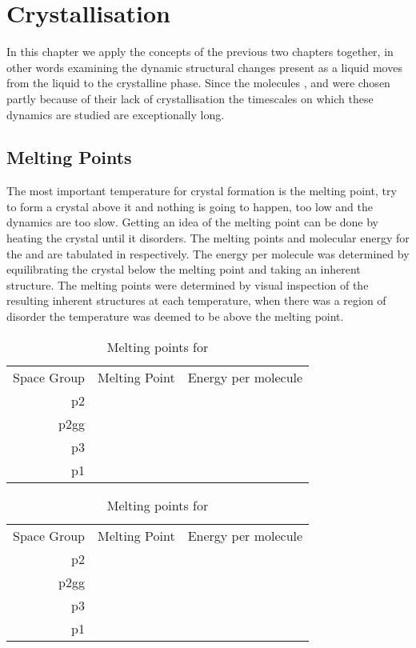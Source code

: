 \chapter{Crystallisation}

In this chapter we apply the concepts of the previous two chapters together, in other words examining the dynamic structural changes present as a liquid moves from the liquid to the crystalline phase. Since the molecules \sone, \sone and \tri were chosen partly because of their lack of crystallisation the timescales on which these dynamics are studied are exceptionally long.


\section{Melting Points}

The most important temperature for crystal formation is the melting point, try to form a crystal above it and nothing is going to happen, too low and the dynamics are too slow. Getting an idea of the melting point can be done by heating the crystal until it disorders. The melting points and molecular energy for the \sone and \scon are tabulated in  respectively. The energy per molecule was determined by equilibrating the crystal below the melting point and taking an inherent structure. The melting points were determined by visual inspection of the resulting inherent structures at each temperature, when there was a region of disorder the temperature was deemed to be above the melting point.

\begin{table}
    \begin{tabular}{r | c c }
        Space Group & Melting Point & Energy per molecule \\
        p2 & & \\
        p2gg & & \\
        p3 & & \\
        p1 & & \\
    \end{tabular}
    \caption{Melting points for \sone}
    \label{tab:melting sone}
\end{table}

\begin{table}
    \begin{tabular}{r | c c }
        Space Group & Melting Point & Energy per molecule \\
        p2 & & \\
        p2gg & & \\
        p3 & & \\
        p1 & & \\
    \end{tabular}
    \caption{Melting points for \scon}
    \label{tab:melting scon}
\end{table}

